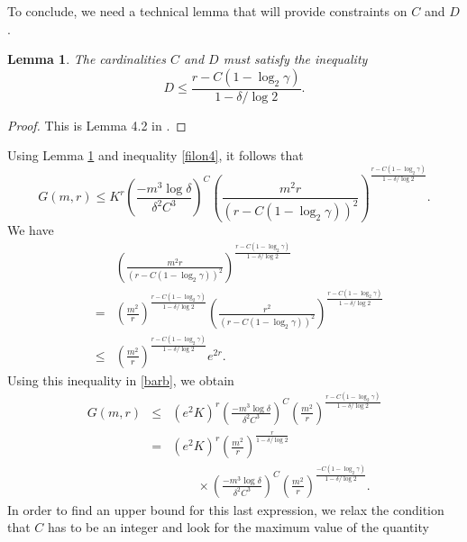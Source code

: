 \documentclass{article}
\newtheorem{lemma}[theorem]{Lemma}
\theoremstyle{definition}
\begin{document}
To conclude, we need a technical lemma that will provide constraints on $C$ and $D$.
\begin{lemma}\label{ub10}
The cardinalities $C$ and $D$ must satisfy the inequality
$$
D\le \frac{r-C(1-\log_2\gamma)}{1-\delta/\log 2}.
$$
\end{lemma}
\begin{proof}
This is Lemma 4.2 in \cite{DKN}.
\end{proof}
Using Lemma \ref{ub10} and inequality \eqref{filon4}, it follows that
\begin{equation}\label{barb}
G(m,r)\le K^r\left(\frac{-m^3\log \delta}{\delta^2 C^3}\right)^{C} \left(\frac{ m^2r}{(r-C(1-\log_2\gamma))^2}\right)^{\frac{r-C(1-\log_2\gamma)}{1-\delta/\log 2}}.
\end{equation}
We have
\begin{eqnarray*}
& &\left(\frac{ m^2r}{(r-C(1-\log_2\gamma))^2}\right)^{\frac{r-C(1-\log_2\gamma)}{1-\delta/\log 2}}\\
&=&\left(\frac{m^2}{r}\right)^{\frac{r-C(1-\log_2\gamma)}{1-\delta/\log 2}}\left(\frac{r^2}{(r-C(1-\log_2\gamma))^2}\right)^{\frac{r-C(1-\log_2\gamma)}{1-\delta/\log 2}}\\
&\le &\left(\frac{m^2}{r}\right)^{\frac{r-C(1-\log_2\gamma)}{1-\delta/\log 2}} e^{2r}.
\end{eqnarray*}
Using this inequality in \eqref{barb}, we obtain
\begin{eqnarray}
G(m,r) &\le& (e^2K)^r\left(\frac{-m^3\log \delta}{\delta^2 C^3}\right)^{C}\left(\frac{m^2}{r}\right)^{\frac{r-C(1-\log_2\gamma)}{1-\delta/\log 2}} \nonumber\\
&=& (e^2K)^r \left(\frac{m^2}{r}\right)^{\frac{r}{1-\delta/\log 2}} \nonumber \\
& & \qquad \times \left(\frac{-m^3\log \delta}{\delta^2 C^3}\right)^{C}\left(\frac{m^2}{r}\right)^{\frac{-C(1-\log_2\gamma)}{1-\delta/\log 2}}.\label{novel1}
\end{eqnarray}
In order to find an upper bound for this last expression, we relax the condition that $C$ has to be an integer and look for the maximum value of the quantity
\end{document}
